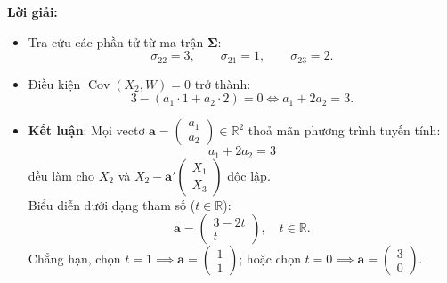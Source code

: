 \documentclass[11pt,a4paper]{article}
\newenvironment{solution}{%
  \par\noindent\textbf{Lời giải:}\ \ignorespaces
}{\par}
\theoremstyle{definition}
\newcommand{\answer}[1]{\boxed{#1}}
\begin{document}
\begin{solution}
\begin{enumerate}[label=\textbf{\alph*)}]
\begin{itemize}
\begin{align*}
      &= \sigma_{22} - a_1 \sigma_{21} - a_2 \sigma_{23}.
    \end{align*}
    \item Tra cứu các phần tử từ ma trận $\boldsymbol{\Sigma}$:
    \[
    \sigma_{22} = 3, \qquad \sigma_{21} = 1, \qquad \sigma_{23} = 2.
    \]
    \item Điều kiện $\operatorname{Cov}(X_2, W) = 0$ trở thành:
    \[
    3 - (a_1 \cdot 1 + a_2 \cdot 2) = 0 \iff a_1 + 2a_2 = 3.
    \]
    \item \textbf{Kết luận}:
    Mọi vectơ $\mathbf{a} = \begin{pmatrix} a_1 \\ a_2 \end{pmatrix} \in \mathbb{R}^2$ thoả mãn phương trình tuyến tính:
    \[
    \answer{a_1 + 2a_2 = 3}
    \]
    đều làm cho $X_2$ và $X_2 - \mathbf{a}'\begin{pmatrix} X_1 \\ X_3 \end{pmatrix}$ độc lập. \\
    Biểu diễn dưới dạng tham số ($t \in \mathbb{R}$):
    \[
    \mathbf{a} = \begin{pmatrix} 3 - 2t \\ t \end{pmatrix}, \quad t \in \mathbb{R}.
    \]
    Chẳng hạn, chọn $t = 1 \implies \mathbf{a} = \begin{pmatrix} 1 \\ 1 \end{pmatrix}$; hoặc chọn $t = 0 \implies \mathbf{a} = \begin{pmatrix} 3 \\ 0 \end{pmatrix}$.
  \end{itemize}


\end{enumerate}
\end{solution}
\end{document}
